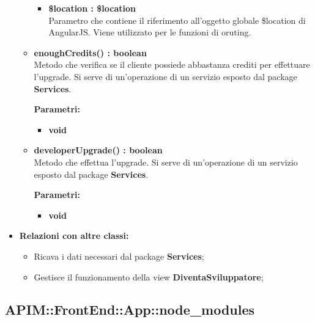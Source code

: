 \begin{itemize}
\begin{itemize}
\begin{itemize}
			\item \textbf{\$location : \$location}\\
			Parametro che contiene il riferimento all'oggetto globale \$location di AngularJS. Viene utilizzato per le funzioni di oruting.
			
		\end{itemize}
		
		\item \textbf{enoughCredits() : boolean}\\
		Metodo che verifica se il cliente possiede abbastanza crediti per effettuare l'upgrade. Si serve di un'operazione di un servizio esposto dal package \textbf{Services}.
		\begin{description}
			\item[\textbf{Parametri:}]
		\end{description}
		\begin{itemize}
			\item \textbf{void}\\
		\end{itemize}
		
		\item \textbf{developerUpgrade() : boolean}\\
		Metodo che effettua l'upgrade. Si serve di un'operazione di un servizio esposto dal package \textbf{Services}.
		\begin{description}
			\item[\textbf{Parametri:}]
		\end{description}
		\begin{itemize}
			\item \textbf{void}\\
		\end{itemize}
		
		
		
	\end{itemize}
	\item \textbf{Relazioni con altre classi:}
	\begin{itemize}
		\item Ricava i dati necessari dal package \textbf{Services};
		\item Gestisce il funzionamento della view \textbf{DiventaSviluppatore};
	\end{itemize}
\end{itemize}


\subsection{APIM::FrontEnd::App::node\_modules}

